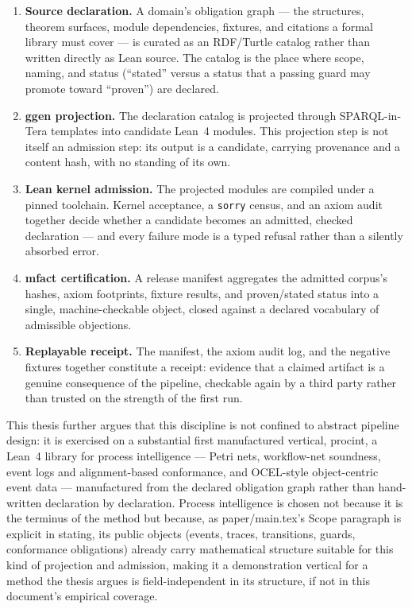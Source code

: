\begin{enumerate}
\item \textbf{Source declaration.} A domain's obligation graph --- the
  structures, theorem surfaces, module dependencies, fixtures, and
  citations a formal library must cover --- is curated as an RDF/Turtle
  catalog rather than written directly as Lean source. The catalog is the
  place where scope, naming, and status (``stated'' versus a status that
  a passing guard may promote toward ``proven'') are declared.
\item \textbf{ggen projection.} The declaration catalog is projected
  through SPARQL-in-Tera templates into candidate Lean~4 modules. This
  projection step is not itself an admission step: its output is a
  candidate, carrying provenance and a content hash, with no standing of
  its own.
\item \textbf{Lean kernel admission.} The projected modules are compiled
  under a pinned toolchain. Kernel acceptance, a \texttt{sorry} census,
  and an axiom audit together decide whether a candidate becomes an
  admitted, checked declaration --- and every failure mode is a typed
  refusal rather than a silently absorbed error.
\item \textbf{mfact certification.} A release manifest aggregates the
  admitted corpus's hashes, axiom footprints, fixture results, and
  proven/stated status into a single, machine-checkable object, closed
  against a declared vocabulary of admissible objections.
\item \textbf{Replayable receipt.} The manifest, the axiom audit log, and
  the negative fixtures together constitute a receipt: evidence that a
  claimed artifact is a genuine consequence of the pipeline, checkable
  again by a third party rather than trusted on the strength of the
  first run.
\end{enumerate}

This thesis further argues that this discipline is not confined to
abstract pipeline design: it is exercised on a substantial first
manufactured vertical, \textsf{procint}, a Lean~4 library for process
intelligence --- Petri nets, workflow-net soundness, event logs and
alignment-based conformance, and OCEL-style object-centric event
data --- manufactured from the declared obligation graph rather than
hand-written declaration by declaration. Process intelligence is chosen
not because it is the terminus of the method but because, as
paper/main.tex's Scope paragraph is explicit in stating, its public
objects (events, traces, transitions, guards, conformance obligations)
already carry mathematical structure suitable for this kind of projection
and admission, making it a demonstration vertical for a method the thesis
argues is field-independent in its structure, if not in this document's
empirical coverage.

